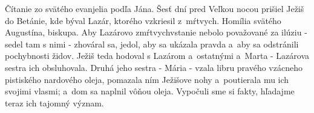 Čítanie zo svätého evanjelia podľa Jána.
Šesť dní pred Veľkou nocou prišiel Ježiš do Betánie, kde býval Lazár, ktorého vzkriesil z~mŕtvych.
\versseparator
Homília svätého Augustína, biskupa.
\versseparator
Aby Lazárovo zmŕtvychvstanie nebolo považované za ilúziu - sedel tam s nimi - zhováral sa, jedol, aby sa ukázala pravda a~aby sa odstránili pochybnosti židov. Ježiš teda hodoval s Lazárom a~ostatnými a~Marta - Lazárova sestra ich obsluhovala. Druhá jeho sestra - Mária - vzala libru pravého vzácneho pistiského nardového oleja, pomazala ním Ježišove nohy a~poutierala mu ich svojimi vlasmi; a~dom sa naplnil vôňou oleja.
Vypočuli sme si fakty, hľadajme teraz ich tajomný význam.